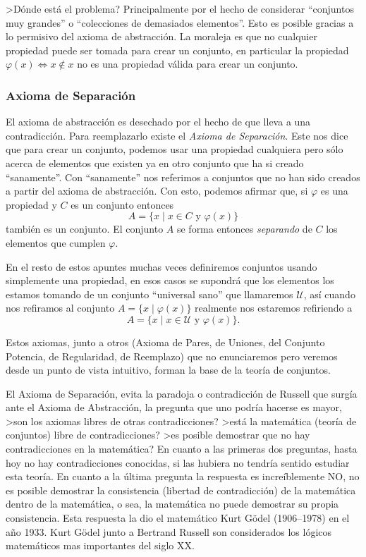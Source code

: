 >Dónde está el problema?
Principalmente por el hecho de considerar ``conjuntos muy grandes'' o ``colecciones de demasiados elementos''.
Esto es posible gracias a lo permisivo del axioma de abstracción.
La moraleja es que no cualquier propiedad puede ser tomada para crear un conjunto, en particular la propiedad $\varphi(x)\Leftrightarrow x\notin x$ no es una propiedad válida para crear un conjunto.

\subsubsection*{Axioma de Separación}
El axioma de abstracción es desechado por el hecho de que lleva a una contradicción.
Para reemplazarlo existe el \emph{Axioma de Separación}.
Este nos dice que para crear un conjunto, podemos usar una propiedad cualquiera pero sólo acerca de elementos que existen ya en otro conjunto que ha si creado ``sanamente''.
Con ``sanamente'' nos referimos a conjuntos que no han sido creados a partir del axioma de abstracción.
Con esto, podemos afirmar que, si $\varphi$ es una propiedad y $C$ es un conjunto entonces
\[
A=\{x\;|\;x\in C\text{ y }\varphi(x)\}
\]
también es un conjunto.
El conjunto $A$ se forma entonces \emph{separando} de $C$ los elementos que cumplen $\varphi$.

En el resto de estos apuntes muchas veces definiremos conjuntos usando simplemente una propiedad, en esos casos se supondrá que los elementos los estamos tomando de un conjunto ``universal sano'' que llamaremos $\mathcal{U}$, así cuando nos refiramos al conjunto $A=\{x\;|\;\varphi(x)\}$ realmente nos estaremos refiriendo a
\[A=\{x\;|\;x\in\mathcal{U}\text{ y }\varphi(x)\}.
\]

\begin{nota}
Estos axiomas, junto a otros (Axioma de Pares, de Uniones, del Conjunto Potencia, de Regularidad, de Reemplazo) que no enunciaremos pero veremos desde un punto de vista intuitivo, forman la base de la teoría de conjuntos.

El Axioma de Separación, evita la paradoja o contradicción de Russell que surgía ante el Axioma de Abstracción, la pregunta que uno podría hacerse es mayor,
>son los axiomas libres de otras contradicciones? 
>está la matemática (teoría de conjuntos) libre de contradicciones?
>es posible demostrar que no hay contradicciones en la matemática?
En cuanto a las primeras dos preguntas, hasta hoy no hay contradicciones conocidas, si las hubiera no tendría sentido estudiar esta teoría.
En cuanto a la última pregunta la respuesta es increíblemente NO, no es posible demostrar la consistencia (libertad de contradicción) de la matemática dentro de la matemática, o sea, la matemática no puede demostrar su propia consistencia.
Esta respuesta la dio el matemático Kurt G\"{o}del (1906--1978) en el año 1933.
Kurt G\"odel junto a Bertrand Russell son considerados los lógicos matemáticos mas importantes del siglo XX.

\end{nota}

